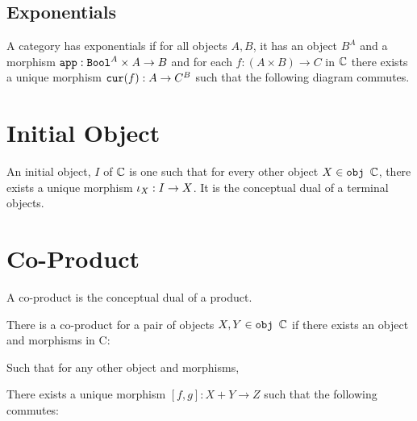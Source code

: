 \documentclass{Report}
\begin{document}
\subsection{Exponentials}
A category has exponentials if for all objects $A, B$, it has an object $B^A$ and a morphism $\texttt{app}: \texttt{Bool}^A \times A \rightarrow B$ and for each $f: (A\times B)\rightarrow C$ in $\mathbb{C}$ there exists a unique morphism $\texttt{cur}(f): A \rightarrow C^B$ such that the following diagram commutes.


\section{Initial Object}

An initial object, $I$ of $\mathbb{C}$ is one such that for every other object $X\in\texttt{obj }\mathbb{C}$, there exists a unique morphism $\iota_X: I\rightarrow X$. It is the conceptual dual of a terminal objects.

\section{Co-Product}
A co-product is the conceptual dual of a product.

There is a co-product for a pair of objects $X, Y\in\texttt{obj }\mathbb{C}$ if there exists an object and morphisms in C:

Such that for any other object and morphisms,


There exists a unique morphism $[f, g]: X + Y \rightarrow Z $ such that the following commutes:


\end{document}
